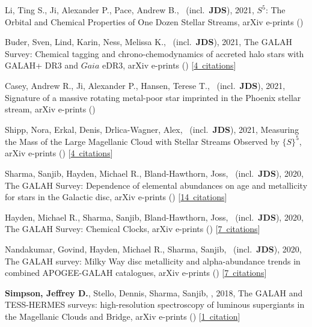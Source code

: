 \item[{\color{numcolor}\scriptsize8}] Li, Ting S., Ji, Alexander P., Pace, Andrew B., \etal\ (incl.\ \textbf{JDS}), 2021, $S^5$: The Orbital and Chemical Properties of One Dozen Stellar Streams, arXiv e-prints ()

\item[{\color{numcolor}\scriptsize7}] Buder, Sven, Lind, Karin, Ness, Melissa K., \etal\ (incl.\ \textbf{JDS}), 2021, The GALAH Survey: Chemical tagging and chrono-chemodynamics of accreted halo stars with GALAH+ DR3 and $Gaia$ eDR3, arXiv e-prints () [\href{https://ui.adsabs.harvard.edu/#abs/2021arXiv210904059B}{4~citations}]

\item[{\color{numcolor}\scriptsize6}] Casey, Andrew R., Ji, Alexander P., Hansen, Terese T., \etal\ (incl.\ \textbf{JDS}), 2021, Signature of a massive rotating metal-poor star imprinted in the Phoenix stellar stream, arXiv e-prints ()

\item[{\color{numcolor}\scriptsize5}] Shipp, Nora, Erkal, Denis, Drlica-Wagner, Alex, \etal\ (incl.\ \textbf{JDS}), 2021, Measuring the Mass of the Large Magellanic Cloud with Stellar Streams Observed by ${\{}S{\}}^5$, arXiv e-prints () [\href{https://ui.adsabs.harvard.edu/#abs/2021arXiv210713004S}{4~citations}]

\item[{\color{numcolor}\scriptsize4}] Sharma, Sanjib, Hayden, Michael R., Bland-Hawthorn, Joss, \etal\ (incl.\ \textbf{JDS}), 2020, The GALAH Survey: Dependence of elemental abundances on age and metallicity for stars in the Galactic disc, arXiv e-prints () [\href{https://ui.adsabs.harvard.edu/#abs/2020arXiv201113818S}{14~citations}]

\item[{\color{numcolor}\scriptsize3}] Hayden, Michael R., Sharma, Sanjib, Bland-Hawthorn, Joss, \etal\ (incl.\ \textbf{JDS}), 2020, The GALAH Survey: Chemical Clocks, arXiv e-prints () [\href{https://ui.adsabs.harvard.edu/#abs/2020arXiv201113745H}{7~citations}]

\item[{\color{numcolor}\scriptsize2}] Nandakumar, Govind, Hayden, Michael R., Sharma, Sanjib, \etal\ (incl.\ \textbf{JDS}), 2020, The GALAH survey: Milky Way disc metallicity and alpha-abundance trends in combined APOGEE-GALAH catalogues, arXiv e-prints () [\href{https://ui.adsabs.harvard.edu/#abs/2020arXiv201102783N}{7~citations}]

\item[{\color{numcolor}\scriptsize1}] \textbf{Simpson, Jeffrey D.}, Stello, Dennis, Sharma, Sanjib, \etal, 2018, The GALAH and TESS-HERMES surveys: high-resolution spectroscopy of luminous supergiants in the Magellanic Clouds and Bridge, arXiv e-prints () [\href{https://ui.adsabs.harvard.edu/#abs/2018arXiv180405900S}{1~citation}]